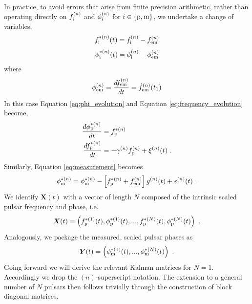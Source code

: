 \documentclass[fleqn,usenatbib,useAMS]{mnras}
\begin{document}
In practice, to avoid errors that arise from finite precision arithmetic, rather than operating directly on $f_{\rm i}^{(n)}$ and $\phi_{\rm i}^{(n)}$ for $i \in \{ \rm p, \rm m \}$, we undertake a change of variables, 
\begin{equation}
	f_{\rm i}^{*(n)}(t) = f_{\rm i}^{(n)} - f_{\rm em}^{(n)}
\end{equation}
\begin{equation}
	\phi_{\rm i}^{*(n)}(t) = \phi_{\rm i}^{(n)} - \phi_{\rm em}^{(n)}
\end{equation}
where 
\begin{equation}
	\phi_{\rm em}^{(n)} = \frac{df_{\rm em}^{(n)}}{dt} = \dot{f}_{\rm em}^{(n)}(t_1)
\end{equation}
In this case Equation \eqref{eq:phi_evolution} and Equation \eqref{eq:frequency_evolution} become,
\begin{align}
	\frac{d \phi_{\rm p}^{*(n)}}{dt} &= f_{\rm p}^{*(n)} \label{eq:phi_scaled_dyn}\\ 
	\frac{df_{\rm p}^{*(n)}}{dt} &= -\gamma^{(n)} f_{\rm p}^{(n)} +\xi^{(n)}(t)\label{eq:f_scaled_dyn}  \ . 
\end{align}
Similarly, Equation \eqref{eq:measurement} becomes
\begin{equation}
	\phi_{\rm m}^{*(n)} = \phi_{\rm m}^{*(n)} - \left[ f_{\rm p}^{*(n)} + f_{\rm em}^{(n)}\right] g^{(n)}(t) +  \varepsilon^{(n)}(t)\ .
	\label{eq:measurement_scaled}
\end{equation}
We identify $\boldsymbol{X}(t)$ with a vector of length $N$ composed of the intrinsic scaled pulsar frequency and phase, i.e. 
\begin{equation}
	\boldsymbol{X}(t) = \left(f_{\rm p}^{*(1)}(t), \phi_{\rm p}^{*(1)}(t), ... , f_{\rm p}^{*(N)}(t), \phi_{\rm p}^{*(N)}(t)\right) \ .
\end{equation}
Analogously, we package the measured, scaled pulsar phases as
\begin{equation}
	\boldsymbol{Y}(t) = \left(\phi_{\rm m}^{*(1)}(t), ..., \phi_{\rm m}^{*(N)}(t) \right) \ .
\end{equation}
Going forward we will derive the relevant Kalman matrices for $N=1$. Accordingly we drop the $(n)$-superscript notation. The extension to a general number of $N$ pulsars then follows trivially through the construction of block diagonal matrices. \newline 
\end{document}
